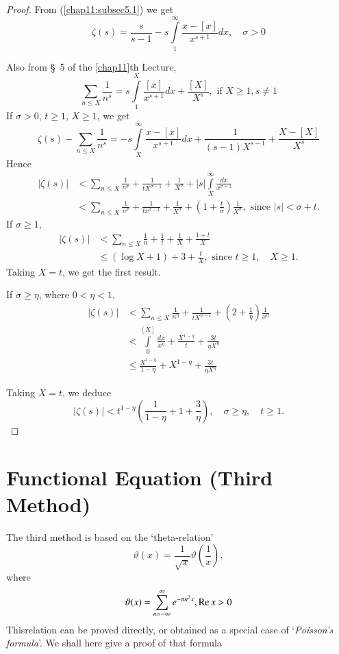 \begin{proof}
From (\ref{chap11:subsec5.1}) we get
$$
\zeta(s) = \frac{s}{s-1} - s\int\limits^\infty_1 \frac{x-[x]}{x^{s+1}}
dx, \quad \sigma >0
$$

Also from \S\ 5 of the \ref{chap11}th Lecture,
$$
\sum\limits_{n \leq X} \frac{1}{n^s} = s \int\limits^X_1
\frac{[x]}{x^{s+1}} dx + \frac{[X]}{X^s}, \text{ if } X \geq 1, s \neq 1
$$
If $\sigma > 0$, $t \geq 1$, $X \geq 1$, we get 
$$
\zeta(s) - \sum_{n \leq X} \frac{1}{n^s} = -s \int\limits^\infty_X
\frac{x-[x]}{x^{s+1}} dx + \frac{1}{(s-1)X^{s-1}} + \frac{X-[X]}{X^s}
$$
Hence
\begin{align*}
|\zeta(s)| &<\sum\limits_{n \leq X} \frac{1}{n^{\sigma}} 
+ \frac{1}{t X^{\sigma -1}} + \frac{1}{X^\sigma} +|s|
\int\limits^\infty_{X} \frac{dx}{x^{\sigma +1}}\\
&< \sum\limits_{n \leq X} \frac{1}{n^\sigma} + \frac{1}{tx^{\sigma-1}}
+ \frac{1}{X^{\sigma}} + \left(1+ \frac{t}{\sigma} \right)
\frac{1}{X^\sigma}, \text{ since } |s| < \sigma +t.
\end{align*}\pageoriginale
If $\sigma \geq 1$,
\begin{align*}
|\zeta(s)| & < \sum\limits_{n \leq X} \frac{1}{n}+ \frac{1}{t} +
\frac{1}{X} + \frac{1+t}{X}\\
& \leq (\log X +1) + 3 + \frac{t}{X}, \text{ since } t \geq 1,\quad X
\geq 1.
\end{align*}
Taking $X=t$, we get the first result.

If $\sigma \geq \eta$, where $0< \eta <1$,
\begin{align*}
|\zeta(s)| & < \sum\limits_{n \leq X} \frac{1}{n^\eta} +
\frac{1}{tX^{\eta-1}} + \left(2+\frac{1}{\eta} \right)
\frac{1}{x^\eta}\\
& < \int\limits^{[X]}_0 \frac{dx}{x^\eta} + \frac{X^{1-\eta}}{t} +
\frac{3t}{\eta X^\eta}\\
& \leq \frac{X^{1-\eta}}{1-\eta} + X^{1-\eta} + \frac{3t}{\eta X^\eta}
\end{align*}

Taking $X =t$, we deduce
$$
|\zeta(s)| < t^{1-\eta} \left(\frac{1}{1-\eta} + 1 + \frac{3}{\eta}
\right), \quad \sigma \geq \eta, \quad t \geq 1.
$$
\end{proof}

\section[Functional Equation (Third Method)]{Functional Equation (Third Method) \cite[p.21]{key16}}\label{chap12:sec7}
The third method is based on the `theta-relation'
$$
\vartheta(x) = \frac{1}{\sqrt{x}} \vartheta\left(\frac{1}{x} \right),
$$
where 
$$
\vartheta (x) = \sum\limits^\infty_{n = - \infty} e^{-\pi n^2x}, \operatorname{Re} x > 0
$$
This\pageoriginale relation can be proved directly, or obtained as a
special case of `\textit{Poisson's formula}'. We shall here give a
proof of that formula \cite[p.37]{key2}

